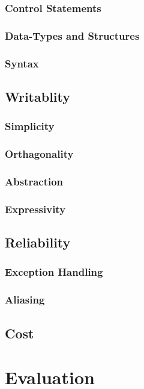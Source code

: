 \documentclass[10pt,a4paper]{article}
\begin{document}
\subsubsection{Control Statements}
\subsubsection{Data-Types and Structures}
\subsubsection{Syntax}

\subsection{Writablity}
\subsubsection{Simplicity}
\subsubsection{Orthagonality}
\subsubsection{Abstraction}
\subsubsection{Expressivity}


\subsection{Reliability}
\subsubsection{Exception Handling}
\subsubsection{Aliasing}

\subsection{Cost}

\section{Evaluation}
\end{document}
